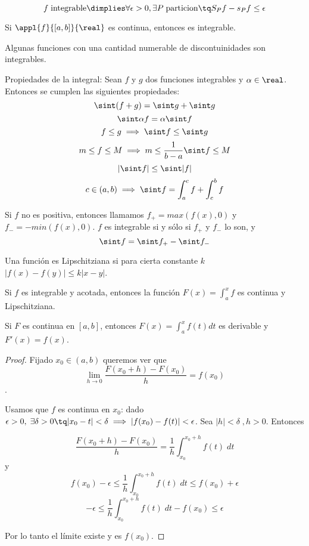 \documentclass[palatino, nochap]{apuntes}
\begin{document}
\begin{prop} \[ f\; \text{integrable} \dimplies \forall \epsilon >0, \exists P \;\mathrm{ particion} \tq S_Pf-s_Pf \leq \epsilon\]\end{prop}

\begin{prop} Si $\appl{f}{[a,b]}{\real}$ es continua, entonces es integrable.\end{prop}

\begin{remark}
Algunas funciones con una cantidad numerable de discontuinidades son integrables.
\end{remark}

Propiedades de la integral: Sean $f$ y $g$ dos funciones integrables y $\alpha \in \real$. Entonces se cumplen las siguientes propiedades: \[\sint (f+g) = \sint g + \sint g \]
 \[ \sint \alpha f = \alpha \sint f \]
 \[ f\leq g \implies \sint f \leq \sint g \]
 \[m\leq f \leq M \implies m \leq \frac{1}{b-a}\sint f \leq M \]
 \[ \left|\sint f\right | \leq \sint |f| \]
 \[ c \in (a,b) \implies \sint  f= \int_a^c f + \int_c^b f \]

\begin{prop} Si $f$ no es positiva, entonces llamamos $f_+ = max(f(x),0)$ y $f_- = - min(f(x),0)$. $f$ es integrable si y sólo si $f_+$ y $f_-$ lo son, y \[\sint  f =\sint f_+ -\sint  f_-\]\end{prop}

\begin{defn}
Una función es Lipschitziana si para cierta constante $k$ $|f(x) - f(y)| \leq k |x-y|$.\end{defn}

\begin{theorem}
Si $f$ es integrable y acotada, entonces la función $F(x)=\int_a^x f$ es continua y Lipschitziana.
\end{theorem}

\begin{theorem}
Si $F$ es continua en $[a,b]$, entonces $F(x)=\int_a^x f(t) dt$ es derivable y $F'(x) = f(x)$.
\end{theorem}

\begin{proof}
Fijado $x_0\in (a,b)$ queremos ver que \[\lim_{h\to 0}\frac{F(x_0+h)-F(x_0)}{h}=f(x_0)\].

Usamos que $f$ es continua en $x_0$: dado $\epsilon>0, \; \exists \delta >0 \tq |x_0-t| < \delta \implies |f(x_0)-f(t)| < \epsilon$. Sea $|h| < \delta\; , h>0$. Entonces

\[ \frac{F(x_0+h)-F(x_0)}{h} = \frac{1}{h} \int_{x_0}^{x_0+h}f(t)\;dt \] y \[ f(x_0)-\epsilon \leq \frac{1}{h} \int_{x_0}^{x_0+h}f(t)\;dt \leq f(x_0) + \epsilon\] \[-\epsilon \leq \frac{1}{h} \int_{x_0}^{x_0+h}f(t)\;dt - f(x_0) \leq  \epsilon\]

Por lo tanto el límite existe y es $f(x_0)$.
\end{proof}
\end{document}
